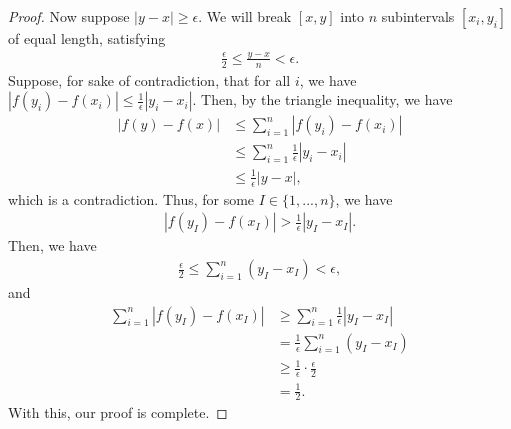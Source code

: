 \documentclass[10pt,a4paper]{article}
\theoremstyle{theorem}
\theoremstyle{definition}
\begin{document}
\begin{proof}
Now suppose $|y - x| \geq \epsilon$. We will break $[x, y]$ into $n$ subintervals $[x_i, y_i]$ of equal length, satisfying
\begin{align*}
\frac{\epsilon}{2} \leq \frac{y - x}{n} < \epsilon.
\end{align*}
Suppose, for sake of contradiction, that for all $i$, we have $|f(y_i) - f(x_i)| \leq \frac{1}{\epsilon}|y_i - x_i|$. Then, by the triangle inequality, we have
\begin{align*}
|f(y) - f(x)| &\leq \sum_{i=1}^n |f(y_i) - f(x_i)|\\
&\leq \sum_{i=1}^n \frac{1}{\epsilon}|y_i - x_i|\\
&\leq \frac{1}{\epsilon}|y - x|,
\end{align*}
which is a contradiction. Thus, for some $I \in \{1, ..., n\}$, we have
\begin{align*}
|f(y_I) - f(x_I)| > \frac{1}{\epsilon}|y_I - x_I|.
\end{align*}
Then, we have
\begin{align*}
\frac{\epsilon}{2} \leq \sum_{i=1}^n (y_I - x_I) < \epsilon,
\end{align*}
and
\begin{align*}
\sum_{i=1}^n |f(y_I) - f(x_I)| &\geq \sum_{i=1}^n \frac{1}{\epsilon}|y_I - x_I|\\
&= \frac{1}{\epsilon} \sum_{i=1}^n (y_I - x_I)\\
&\geq \frac{1}{\epsilon} \cdot \frac{\epsilon}{2}\\
&= \frac{1}{2}.
\end{align*}
With this, our proof is complete.
\end{proof}
\end{document}
